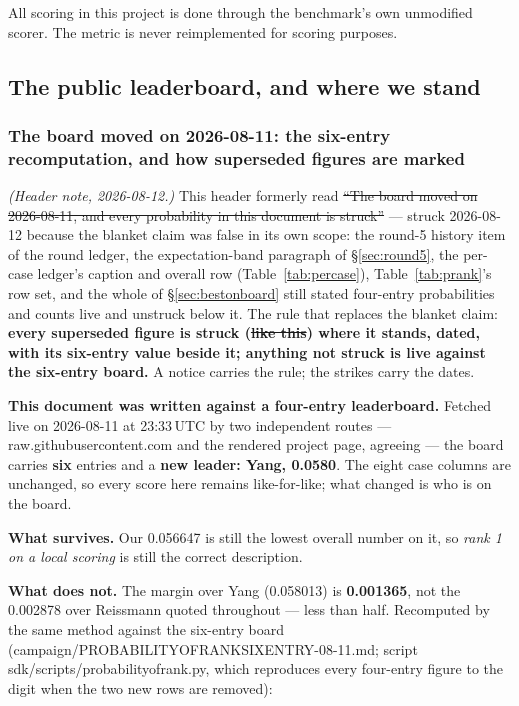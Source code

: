 \documentclass[11pt,a4paper]{article}
\newcommand{\breakus}{\textunderscore\allowbreak}
\newcommand{\code}[1]{{\small\ttfamily\let\_\breakus #1}}
\newcommand{\artifact}[1]{{\footnotesize\ttfamily\let\_\breakus #1}}
\begin{document}
All scoring in this project is done through the benchmark's own unmodified scorer. The
metric is never reimplemented for scoring purposes.

\subsection{The public leaderboard, and where we stand}

\subsubsection*{The board moved on 2026-08-11: the six-entry recomputation, and how superseded figures are marked}
\label{sec:boardmoved}

\emph{(Header note, 2026-08-12.)} This header formerly read \sout{``The board moved on
2026-08-11, and every probability in this document is struck''} --- struck 2026-08-12
because the blanket claim was false in its own scope: the round-5 history item of the
round ledger, the expectation-band paragraph of \S\ref{sec:round5}, the per-case ledger's
caption and overall row (Table~\ref{tab:percase}), Table~\ref{tab:prank}'s row set, and
the whole of \S\ref{sec:bestonboard} still stated four-entry probabilities and counts
live and unstruck below it. The rule that replaces the blanket claim: \textbf{every
superseded figure is struck (\sout{like this}) where it stands, dated, with its six-entry
value beside it; anything not struck is live against the six-entry board.} A notice
carries the rule; the strikes carry the dates.

\textbf{This document was written against a four-entry leaderboard.} Fetched live on
2026-08-11 at 23:33\,UTC by two independent routes --- \code{raw.githubusercontent.com}
and the rendered project page, agreeing --- the board carries \textbf{six} entries and a
\textbf{new leader: Yang, 0.0580}. The eight case columns are unchanged, so every score
here remains like-for-like; what changed is who is on the board.

\textbf{What survives.} Our 0.056647 is still the lowest overall number on it, so
\emph{rank 1 on a local scoring} is still the correct description.

\textbf{What does not.} The margin over Yang (0.058013) is \textbf{0.001365}, not the 0.002878
over Reissmann quoted throughout --- less than half. Recomputed by the same method against
the six-entry board (\artifact{campaign/PROBABILITY\_OF\_RANK\_SIX\_ENTRY\_2026-08-11.md};
script \artifact{sdk/scripts/probability\_of\_rank.py}, which reproduces every four-entry
figure to the digit when the two new rows are removed):
\end{document}
